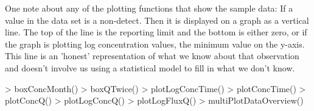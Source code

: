 \documentclass[a4paper,11pt]{article}
\begin{document}
One note about any of the plotting functions that show the sample data:  If a value in the data set is a non-detect. Then it is displayed on a graph as a vertical line.  The top of the line is the reporting limit and the bottom is either zero, or if the graph is plotting log concentration values, the minimum value on the y-axis.  This line is an 'honest' representation of what we know about that observation and doesn't involve us using a statistical model to fill in what we don't know. 


\begin{Schunk}
\begin{Sinput}
> boxConcMonth()
> boxQTwice()
> plotLogConcTime()
> plotConcTime()
> plotConcQ()
> plotLogConcQ()
> plotLogFluxQ()
> multiPlotDataOverview()
\end{Sinput}
\end{Schunk}
\end{document}
